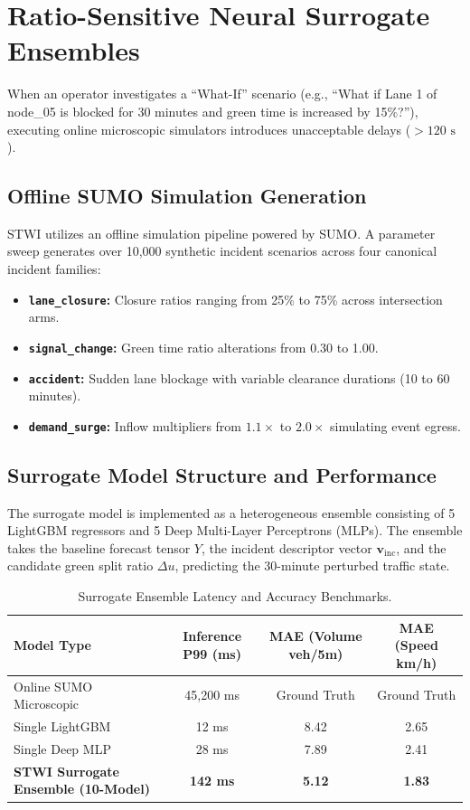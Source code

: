 \section{Ratio-Sensitive Neural Surrogate Ensembles}
When an operator investigates a ``What-If'' scenario (e.g., ``What if Lane 1 of node\_05 is blocked for 30 minutes and green time is increased by 15\%?''), executing online microscopic simulators introduces unacceptable delays ($> 120\text{ s}$).

\subsection{Offline SUMO Simulation Generation}
STWI utilizes an offline simulation pipeline powered by SUMO. A parameter sweep generates over 10,000 synthetic incident scenarios across four canonical incident families:
\begin{itemize}[leftmargin=1.5cm, label=$\bullet$]
  \item \textbf{\texttt{lane\_closure}:} Closure ratios ranging from 25\% to 75\% across intersection arms.
  \item \textbf{\texttt{signal\_change}:} Green time ratio alterations from 0.30 to 1.00.
  \item \textbf{\texttt{accident}:} Sudden lane blockage with variable clearance durations (10 to 60 minutes).
  \item \textbf{\texttt{demand\_surge}:} Inflow multipliers from $1.1\times$ to $2.0\times$ simulating event egress.
\end{itemize}

\subsection{Surrogate Model Structure and Performance}
The surrogate model is implemented as a heterogeneous ensemble consisting of 5 LightGBM regressors and 5 Deep Multi-Layer Perceptrons (MLPs). The ensemble takes the baseline forecast tensor $Y$, the incident descriptor vector $\mathbf{v}_{\text{inc}}$, and the candidate green split ratio $\Delta u$, predicting the 30-minute perturbed traffic state.

\begin{table}[H]
\centering
\caption{Surrogate Ensemble Latency and Accuracy Benchmarks.}
\label{tab:surrogate_perf}
\begin{tabular}{|l|c|c|c|}
\hline
\rowcolor{blue!10}
\textbf{Model Type} & \textbf{Inference P99 (ms)} & \textbf{MAE (Volume veh/5m)} & \textbf{MAE (Speed km/h)} \\
\hline
Online SUMO Microscopic & 45,200 ms & Ground Truth & Ground Truth \\
Single LightGBM & 12 ms & 8.42 & 2.65 \\
Single Deep MLP & 28 ms & 7.89 & 2.41 \\
\textbf{STWI Surrogate Ensemble (10-Model)} & \textbf{142 ms} & \textbf{5.12} & \textbf{1.83} \\
\hline
\end{tabular}
\end{table}

